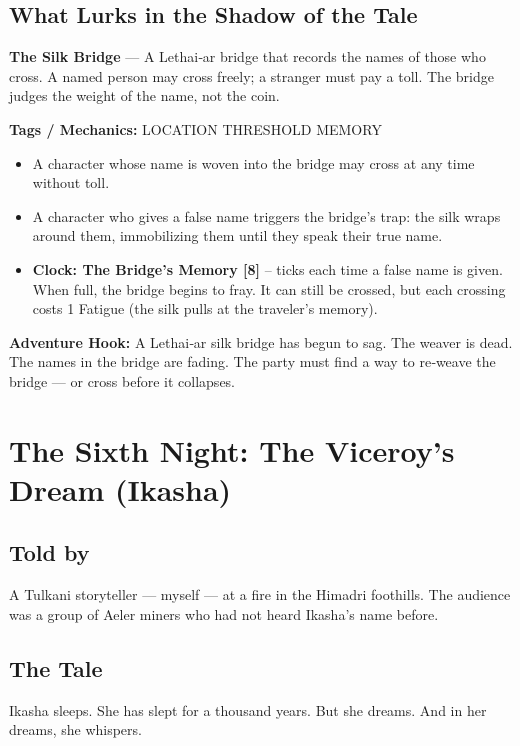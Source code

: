 \documentclass[10pt,twoside]{book}
\newcommand{\tag}[1]{\textsc{#1}}
\begin{document}
\section*{What Lurks in the Shadow of the Tale}
\begin{infobox}
\textbf{The Silk Bridge} --- A Lethai‑ar bridge that records the names of those who cross. A named person may cross freely; a stranger must pay a toll. The bridge judges the weight of the name, not the coin.

\textbf{Tags / Mechanics:} \tag{LOCATION} \tag{THRESHOLD} \tag{MEMORY}

\begin{itemize}
\item A character whose name is woven into the bridge may cross at any time without toll.
\item A character who gives a false name triggers the bridge's trap: the silk wraps around them, immobilizing them until they speak their true name.
\item \textbf{Clock: The Bridge's Memory [8]} -- ticks each time a false name is given. When full, the bridge begins to fray. It can still be crossed, but each crossing costs 1 Fatigue (the silk pulls at the traveler's memory).
\end{itemize}

\textbf{Adventure Hook:} A Lethai‑ar silk bridge has begun to sag. The weaver is dead. The names in the bridge are fading. The party must find a way to re‑weave the bridge --- or cross before it collapses.
\end{infobox}

\chapter{The Sixth Night: The Viceroy's Dream (Ikasha)}

\section*{Told by}
A Tulkani storyteller --- myself --- at a fire in the Himadri foothills. The audience was a group of Aeler miners who had not heard Ikasha's name before.

\section*{The Tale}
Ikasha sleeps. She has slept for a thousand years. But she dreams. And in her dreams, she whispers.
\end{document}
